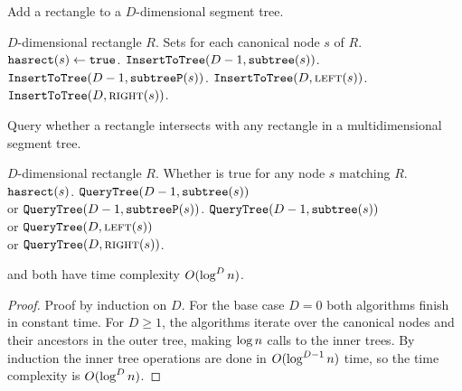 \documentclass[english,gradu]{tktltiki2018}
\begin{document}
\begin{algorithm}
\caption{Add a rectangle to a $D$-dimensional segment tree.}\label{alg:rectadd}
\begin{algorithmic}
\Require $D$-dimensional rectangle $R$.
\Ensure Sets  for each canonical node $s$ of $R$.
		\State $\texttt{hasrect}(s)\gets\texttt{true}$.
		\State $\texttt{InsertToTree}(D-1,\texttt{subtree}(s))$.
		\State $\texttt{InsertToTree}(D-1,\texttt{subtreeP}(s))$.
		\State $\texttt{InsertToTree}(D,\textsc{left}(s))$.
		\State $\texttt{InsertToTree}(D,\textsc{right}(s))$.
	\EndIf
\EndProcedure
\end{algorithmic}
\end{algorithm}

\begin{algorithm}
\caption{Query whether a rectangle intersects with any rectangle in a multidimensional segment tree.}\label{alg:rectcheck}
\begin{algorithmic}
\Require $D$-dimensional rectangle $R$.
\Output Whether  is true for any node $s$ matching $R$.
		\State \Return $\texttt{hasrect}(s)$.
		\State \Return $\texttt{QueryTree}(D-1,\texttt{subtree}(s))$ \\
		\hspace{20mm} or $\texttt{QueryTree}(D-1,\texttt{subtreeP}(s))$.
		\State \Return $\texttt{QueryTree}(D-1,\texttt{subtree}(s))$ \\
		\hspace{20mm} or $\texttt{QueryTree}(D,\textsc{left}(s))$ \\
		\hspace{20mm} or $\texttt{QueryTree}(D,\textsc{right}(s))$.
	\EndIf
\EndProcedure
\end{algorithmic}
\end{algorithm}

\begin{lem}\adddt and \checkdt both have time complexity $O(\log^Dn)$.\end{lem}
\begin{proof}
Proof by induction on $D$.
For the base case $D=0$ both algorithms finish in constant time.
For $D\ge 1$, the algorithms iterate over the canonical nodes and their ancestors in the outer tree, making $\log n$ calls to the inner trees.
By induction the inner tree operations are done in $O(\log^{D-1}n)$ time, so the time complexity is $O(\log^Dn)$.
\end{proof}
\end{document}
